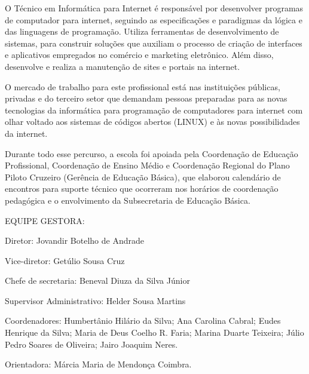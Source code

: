 O Técnico em Informática para Internet é responsável por desenvolver programas de computador para internet, seguindo as especificações e paradigmas da lógica e das linguagens de programação. Utiliza ferramentas de desenvolvimento de sistemas, para construir soluções que auxiliam o processo de criação de interfaces e aplicativos empregados no comércio e marketing eletrônico. Além disso, desenvolve e realiza a manutenção de sites e portais na internet.

O mercado de trabalho para este profissional está nas instituições públicas, privadas e do terceiro setor que demandam pessoas preparadas para as novas tecnologias da informática para programação de computadores para internet com olhar voltado aos sistemas de códigos abertos (LINUX) e às novas possibilidades da internet.

Durante todo esse percurso, a escola foi apoiada pela Coordenação de Educação Profissional, Coordenação de Ensino Médio e Coordenação Regional do Plano Piloto Cruzeiro (Gerência de Educação Básica), que elaborou calendário de encontros para suporte técnico que ocorreram nos horários de coordenação pedagógica e o envolvimento da Subsecretaria de Educação Básica.

EQUIPE GESTORA:

Diretor: Jovandir Botelho de Andrade

Vice-diretor: Getúlio Sousa Cruz

Chefe de secretaria: Beneval Diuza da Silva Júnior 

Supervisor Administrativo: Helder Sousa Martins

Coordenadores: 	Humbertânio Hilário da Silva;
Ana Carolina Cabral;
Eudes Henrique da Silva;
Maria de Deus Coelho R. Faria;
Marina Duarte Teixeira;
Júlio Pedro Soares de Oliveira;
Jairo Joaquim Neres.

Orientadora: Márcia Maria de Mendonça Coimbra.

\newpage